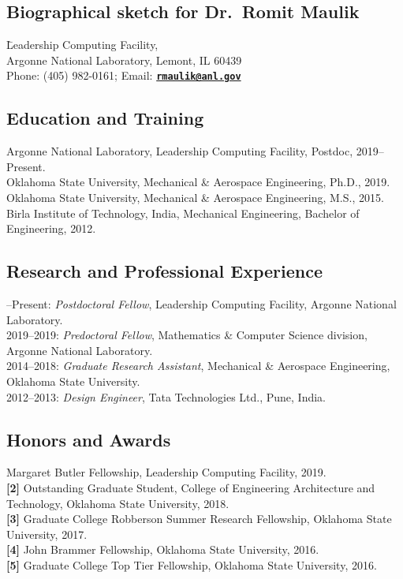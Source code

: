 \documentclass[11pt]{article}
\begin{document}
\pagestyle{empty}

\subsection*{Biographical sketch for Dr.~Romit Maulik}

\begin{tabbing}
  \=Leadership Computing Facility,\\
  \>Argonne National Laboratory, 
Lemont, IL 60439\\
  \>Phone:  (405) 982-0161; Email:  \href{mailto:rmaulik@anl.gov}{\bf \texttt{rmaulik@anl.gov}}
\end{tabbing}


\subsection*{Education and Training}
\noindent	Argonne National Laboratory, Leadership Computing Facility, Postdoc, 2019--Present.\\
	Oklahoma State University, Mechanical \& Aerospace Engineering, Ph.D., 2019.\\
	Oklahoma State University, Mechanical \& Aerospace Engineering, M.S., 2015.\\
	Birla Institute of Technology, India, Mechanical Engineering, Bachelor of Engineering, 2012.


\subsection*{Research and Professional Experience}
--Present: {\em Postdoctoral Fellow}, Leadership Computing Facility, Argonne National Laboratory.\\
2019--2019: {\em Predoctoral Fellow}, Mathematics \& Computer Science division, Argonne National Laboratory.\\ 
2014--2018: {\em Graduate Research Assistant}, Mechanical \& Aerospace Engineering, Oklahoma State University.\\ 
2012--2013: {\em Design Engineer}, Tata Technologies Ltd., Pune, India.


\subsection*{Honors and Awards}
\noindent {\bf[1]} Margaret Butler Fellowship, Leadership Computing Facility, 2019. \\
{\bf[2]} Outstanding Graduate Student, College of Engineering Architecture and Technology, Oklahoma State University, 2018. \\
{\bf[3]} Graduate College Robberson Summer Research Fellowship, Oklahoma State University, 2017. \\
{\bf[4]} John Brammer Fellowship, Oklahoma State University, 2016. \\
{\bf[5]} Graduate College Top Tier Fellowship, Oklahoma State University, 2016.
\end{document}
